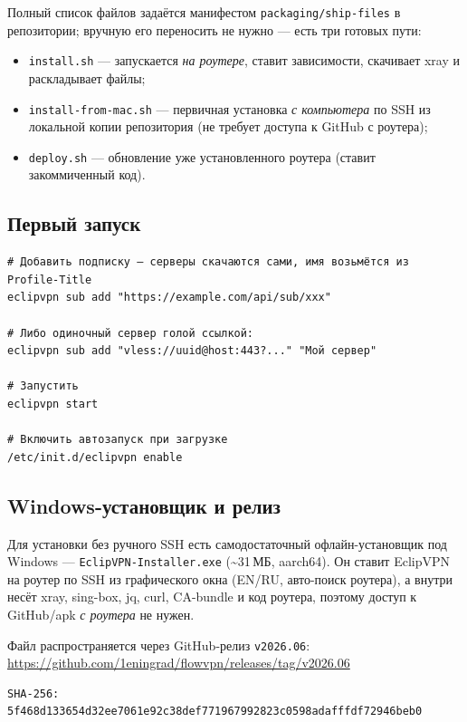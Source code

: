\documentclass[11pt,a4paper]{article}
\begin{document}
Полный список файлов задаётся манифестом \texttt{packaging/ship-files} в репозитории; вручную его переносить не нужно --- есть три готовых пути:

\begin{itemize}
\item \texttt{install.sh} --- запускается \emph{на роутере}, ставит зависимости, скачивает xray и раскладывает файлы;
\item \texttt{install-from-mac.sh} --- первичная установка \emph{с компьютера} по SSH из локальной копии репозитория (не требует доступа к GitHub с роутера);
\item \texttt{deploy.sh} --- обновление уже установленного роутера (ставит закоммиченный код).
\end{itemize}

\subsection{Первый запуск}

\begin{lstlisting}
# Добавить подписку — серверы скачаются сами, имя возьмётся из Profile-Title
eclipvpn sub add "https://example.com/api/sub/xxx"

# Либо одиночный сервер голой ссылкой:
eclipvpn sub add "vless://uuid@host:443?..." "Мой сервер"

# Запустить
eclipvpn start

# Включить автозапуск при загрузке
/etc/init.d/eclipvpn enable
\end{lstlisting}

\subsection{Windows-установщик и релиз}

Для установки без ручного SSH есть самодостаточный офлайн-установщик под Windows — \texttt{EclipVPN-Installer.exe} (\textasciitilde{}31\,МБ, aarch64). Он ставит EclipVPN на роутер по SSH из графического окна (EN/RU, авто-поиск роутера), а внутри несёт xray, sing-box, jq, curl, CA-bundle и код роутера, поэтому доступ к GitHub/apk \emph{с роутера} не нужен.

Файл распространяется через GitHub-релиз \texttt{v2026.06}: \url{https://github.com/1eningrad/flowvpn/releases/tag/v2026.06}

\begin{lstlisting}
SHA-256: 5f468d133654d32ee7061e92c38def771967992823c0598adafffdf72946beb0
\end{lstlisting}
\end{document}
